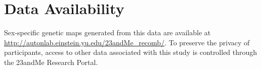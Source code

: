 \section{Data Availability}

Sex-specific genetic maps generated from this data are available at  
\url{http://autonlab.einstein.yu.edu/23andMe_recomb/}. To preserve the privacy of  
participants, access to other data associated with this study is controlled through  
the 23andMe Research Portal\cite{23andMe2013}.

\renewcommand{\bibname}{Supplementary References}

\begingroup
    \setlength{\bibsep}{10pt}
    \linespread{1}\selectfont
    
\endgroup










